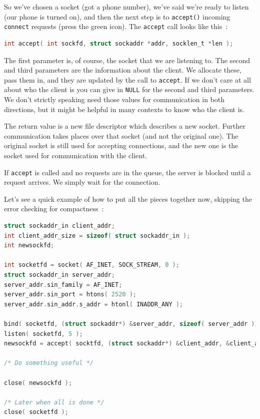 \documentclass[a4paper]{report}
\begin{document}
So we've chosen a socket (got a phone number), we've said we're ready to listen (our phone is turned on), and then the next step is to \texttt{accept()} incoming \texttt{connect} requests (press the green icon). The \texttt{accept} call looks like this~\cite{apunix}:

\begin{lstlisting}[language=C]
int accept( int sockfd, struct sockaddr *addr, socklen_t *len ); 
\end{lstlisting}

The first parameter is, of course, the socket that we are listening to. The second and third parameters are the information about the client. We allocate these, pass them in, and they are updated by the call to \texttt{accept}. If we don't care at all about who the client is you can give in \texttt{NULL} for the second and third parameters. We don't strictly speaking need those values for communication in both directions, but it might be helpful in many contexts to know who the client is.

The return value is a new file descriptor which describes a new socket. Further communication takes places over that socket (and not the original one). The original socket is still used for accepting connections, and the new one is the socket used for communication with the client.

If \texttt{accept} is called and no requests are in the queue, the server is blocked until a request arrives. We simply wait for the connection.

Let's see a quick example of how to put all the pieces together now, skipping the error checking for compactness~\cite{getaddrinfo}:

\begin{lstlisting}[language=C]
struct sockaddr_in client_addr;
int client_addr_size = sizeof( struct sockaddr_in );
int newsockfd;

int socketfd = socket( AF_INET, SOCK_STREAM, 0 );
struct sockaddr_in server_addr;
server_addr.sin_family = AF_INET;
server_addr.sin_port = htons( 2520 );
server_addr.sin_addr.s_addr = htonl( INADDR_ANY );

bind( socketfd, (struct sockaddr*) &server_addr, sizeof( server_addr ));
listen( socketfd, 5 );
newsockfd = accept( socktfd, (struct sockaddr*) &client_addr, &client_addr_size );

/* Do something useful */

close( newsockfd );

/* Later when all is done */
close( socketfd );
\end{lstlisting}
\end{document}
